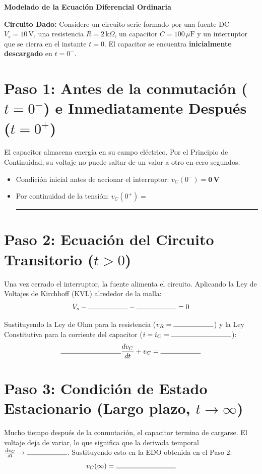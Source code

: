 \documentclass[11pt, a4paper]{article}
\begin{document}
\begin{tcolorbox}[colback=ucbblue!5!white, colframe=ucbblue, title=\textbf{Hoja de Derivación Guiada: Respuesta de un Circuito RC de Primer Orden}]
    \centering \textbf{Modelado de la Ecuación Diferencial Ordinaria}
\end{tcolorbox}

\noindent\textbf{Circuito Dado:} Considere un circuito serie formado por una fuente DC $V_s=10\,\text{V}$, una resistencia $R=2\,\text{k}\Omega$, un capacitor $C=100\,\mu\text{F}$ y un interruptor que se cierra en el instante $t=0$. El capacitor se encuentra \textbf{inicialmente descargado} en $t=0^-$.

\vspace{0.4cm}
\section*{Paso 1: Antes de la conmutación ($t=0^-$) e Inmediatamente Después ($t=0^+$)}
El capacitor almacena energía en su campo eléctrico. Por el Principio de Continuidad, su voltaje no puede saltar de un valor a otro en cero segundos.
\begin{itemize}
    \item Condición inicial antes de accionar el interruptor: $v_C(0^-) = \mathbf{0\,\text{V}}$
    \item Por continuidad de la tensión: $v_C(0^+) =$ \rule{3cm}{0.4pt}
\end{itemize}

\section*{Paso 2: Ecuación del Circuito Transitorio ($t > 0$)}
Una vez cerrado el interruptor, la fuente alimenta el circuito. Aplicando la Ley de Voltajes de Kirchhoff (KVL) alrededor de la malla:
\begin{equation}
    V_s - \rule{2cm}{0.4pt} - \rule{2cm}{0.4pt} = 0
\end{equation}

Sustituyendo la Ley de Ohm para la resistencia ($v_R = \rule{2cm}{0.4pt}$) y la Ley Constitutiva para la corriente del capacitor ($i = i_C = \rule{3cm}{0.4pt}$):
\begin{equation}
    \rule{3cm}{0.4pt} \frac{dv_C}{dt} + v_C = \rule{2cm}{0.4pt}
\end{equation}

\section*{Paso 3: Condición de Estado Estacionario (Largo plazo, $t \to \infty$)}
Mucho tiempo después de la conmutación, el capacitor termina de cargarse. El voltaje deja de variar, lo que significa que la derivada temporal $\frac{dv_C}{dt} \to \rule{2cm}{0.4pt}$.
Sustituyendo esto en la EDO obtenida en el Paso 2:
\begin{equation}
    v_C(\infty) = \rule{3cm}{0.4pt}
\end{equation}
\end{document}
